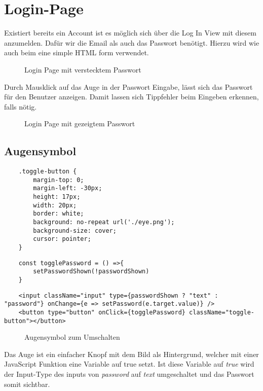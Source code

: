 \pagebreak
\section{Login-Page}
\label{login-page}

Existiert bereits ein Account ist es möglich sich über die Log In View mit diesem anzumelden. Dafür 
wir die Email als auch das Passwort benötigt. Hierzu wird wie auch beim  eine 
simple HTML form verwendet. 

\begin{figure}[H]
    \begin{center}
      \caption{Login Page mit verstecktem Passwort}
    \end{center}
\end{figure}

Durch Mausklick auf das Auge in der Passwort Eingabe, lässt sich das Passwort für den Benutzer
anzeigen. Damit lassen sich Tippfehler beim Eingeben erkennen, falls nötig. 

\begin{figure}[H]
    \begin{center}
      \caption{Login Page mit gezeigtem Passwort}
    \end{center}
\end{figure}

\subsection{Augensymbol}

\begin{lstlisting}
    .toggle-button {
        margin-top: 0;
        margin-left: -30px;
        height: 17px;
        width: 20px;
        border: white;
        background: no-repeat url('./eye.png');
        background-size: cover;
        cursor: pointer;
    }
\end{lstlisting}
\begin{lstlisting}
    const togglePassword = () =>{
        setPasswordShown(!passwordShown)
    }
\end{lstlisting}
\begin{lstlisting}
    <input className="input" type={passwordShown ? "text" : "password"} onChange={e => setPassword(e.target.value)} />
    <button type="button" onClick={togglePassword} className="toggle-button"></button>
\end{lstlisting}

\begin{figure}[H]
    \begin{center}
      \caption{Augensymbol zum Umschalten}
    \end{center}
\end{figure}

Das Auge ist ein einfacher Knopf mit dem Bild als Hintergrund, welcher mit einer JavaScript Funktion 
eine Variable auf true setzt. Ist diese Variable auf \textit{true} wird der Input-Type des inputs von
\textit{password} auf \textit{text} umgeschaltet und das Passwort somit sichtbar. 
